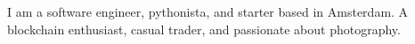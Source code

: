 

\begin{cvparagraph}

I am a software engineer, pythonista, and starter based in Amsterdam. A blockchain enthusiast, casual trader, and passionate about photography.

\end{cvparagraph}
